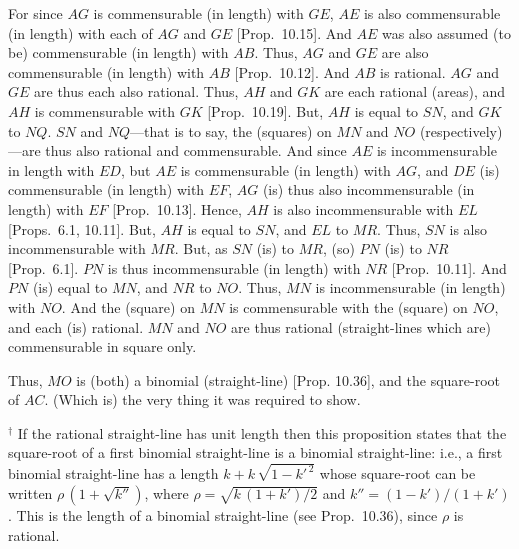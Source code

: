 \begin{Parallel}{}{}
{For since $AG$ is commensurable (in length) with $GE$, $AE$ is also commensurable (in length)
with each of $AG$ and $GE$ [Prop.~10.15]. 
And $AE$ was also assumed (to be) commensurable (in length) with $AB$.  Thus,
$AG$ and $GE$ are also commensurable (in length) with $AB$
[Prop.~10.12]. And $AB$ is rational. $AG$
and $GE$ are thus each also  rational. Thus, $AH$ and $GK$ are each
rational (areas), and $AH$ is commensurable with $GK$ [Prop.~10.19]. But, $AH$ is equal to $SN$,
and $GK$ to $NQ$. $SN$ and $NQ$---that is to say, the (squares)
on $MN$ and $NO$ (respectively)---are thus also rational and commensurable. And since $AE$ is incommensurable in length with $ED$,
but $AE$ is commensurable (in length) with $AG$, and $DE$ (is) commensurable (in length)
with $EF$, $AG$ (is) thus also incommensurable (in length) with $EF$
[Prop.~10.13]. Hence, $AH$ is also incommensurable with $EL$ [Props.~6.1, 10.11]. But, $AH$ is equal to $SN$, and $EL$
to $MR$. Thus, $SN$ is also incommensurable with $MR$. But, as
$SN$ (is) to $MR$, (so) $PN$ (is) to $NR$ [Prop.~6.1].  $PN$ is thus incommensurable (in length) with $NR$ [Prop.~10.11]. And $PN$ (is) equal to $MN$, and $NR$ to
$NO$. Thus, $MN$ is incommensurable (in length) with $NO$. And the (square)
on $MN$ is commensurable with the (square) on $NO$, and each (is)
rational.  $MN$ and $NO$ are thus rational (straight-lines which are)
commensurable in square only.

Thus, $MO$ is (both) a binomial (straight-line) [Prop. 10.36], and the square-root of $AC$.
(Which is) the very thing it was required to show.}
\end{Parallel}
{\footnotesize\noindent $^\dag$ If the rational straight-line has unit length then this proposition states that the square-root of 
a first binomial straight-line is a binomial straight-line: {i.e.}, 
a first binomial straight-line has a length $k+k\,\sqrt{1-k'^{\,2}}$ whose
square-root can be written $\rho\,(1+\sqrt{k''})$, where $\rho=\sqrt{k\,(1+k')/2}$ and $k''=(1-k')/(1+k')$. This is the length of a binomial straight-line (see Prop.~10.36), since $\rho$ is rational.}


